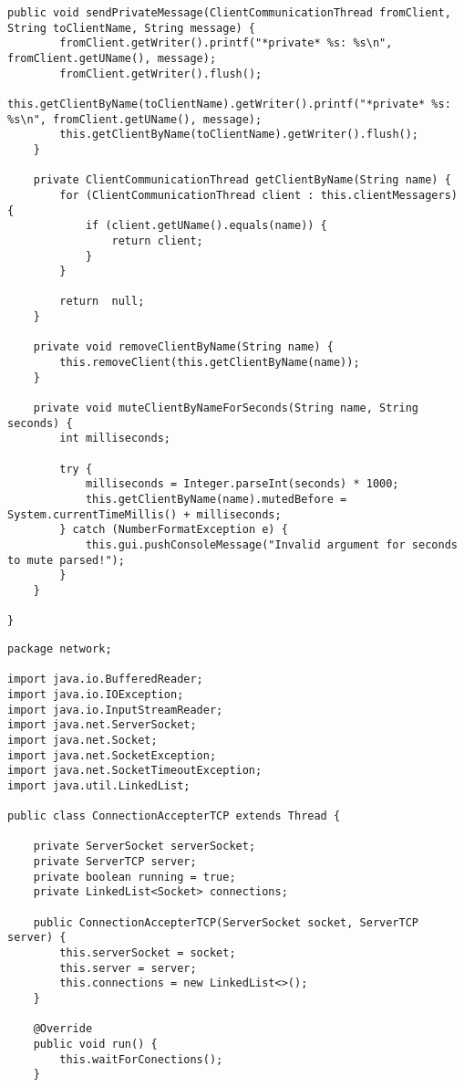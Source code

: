 \begin{enumerate}
\begin{lstlisting}[style=java]
    public void sendPrivateMessage(ClientCommunicationThread fromClient, String toClientName, String message) {
        fromClient.getWriter().printf("*private* %s: %s\n", fromClient.getUName(), message);
        fromClient.getWriter().flush();
        this.getClientByName(toClientName).getWriter().printf("*private* %s: %s\n", fromClient.getUName(), message);
        this.getClientByName(toClientName).getWriter().flush();
    }

    private ClientCommunicationThread getClientByName(String name) {
        for (ClientCommunicationThread client : this.clientMessagers) {
            if (client.getUName().equals(name)) {
                return client;
            }
        }

        return  null;
    }

    private void removeClientByName(String name) {
        this.removeClient(this.getClientByName(name));
    }

    private void muteClientByNameForSeconds(String name, String seconds) {
        int milliseconds;

        try {
            milliseconds = Integer.parseInt(seconds) * 1000;
            this.getClientByName(name).mutedBefore = System.currentTimeMillis() + milliseconds;
        } catch (NumberFormatException e) {
            this.gui.pushConsoleMessage("Invalid argument for seconds to mute parsed!");
        }
    }

}

\end{lstlisting}

\begin{lstlisting}[style=java]
package network;

import java.io.BufferedReader;
import java.io.IOException;
import java.io.InputStreamReader;
import java.net.ServerSocket;
import java.net.Socket;
import java.net.SocketException;
import java.net.SocketTimeoutException;
import java.util.LinkedList;

public class ConnectionAccepterTCP extends Thread {

    private ServerSocket serverSocket;
    private ServerTCP server;
    private boolean running = true;
    private LinkedList<Socket> connections;

    public ConnectionAccepterTCP(ServerSocket socket, ServerTCP server) {
        this.serverSocket = socket;
        this.server = server;
        this.connections = new LinkedList<>();
    }

    @Override
    public void run() {
        this.waitForConections();
    }


\end{lstlisting}
\end{enumerate}
